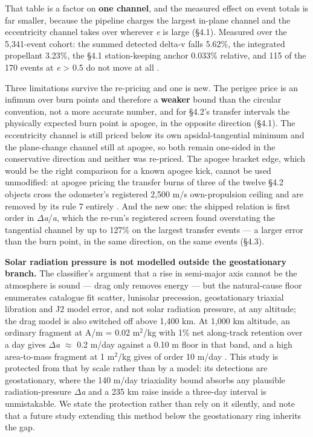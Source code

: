\documentclass[11pt]{article}
\begin{document}

That table is a factor on \textbf{one channel}, and the measured effect on event totals is far smaller, because the pipeline charges the largest in-plane channel and the eccentricity channel takes over wherever \emph{e} is large (\S{}4.1). Measured over the 5,341-event cohort: the summed detected delta-v falls 5.62\%, the integrated propellant 3.23\%, the \S{}4.1 station-keeping anchor 0.033\% relative, and 115 of the 170 events at \emph{e} > 0.5 do not move at all%
.

Three limitations survive the re-pricing and one is new. The perigee price is an infimum over burn points and therefore a \textbf{weaker} bound than the circular convention, not a more accurate number, and for \S{}4.2's transfer intervals the physically expected burn point is apogee, in the opposite direction (\S{}4.1). The eccentricity channel is still priced below its own apsidal-tangential minimum and the plane-change channel still at apogee, so both remain one-sided in the conservative direction and neither was re-priced. The apogee bracket edge, which would be the right comparison for a known apogee kick, cannot be used unmodified: at apogee pricing the transfer burns of three of the twelve \S{}4.2 objects cross the odometer's registered 2,500 m/s own-propulsion ceiling and are removed by its rule 7 entirely%
. And the new one: the shipped relation is first order in $\Delta$\emph{a}/\emph{a}, which the re-run's registered screen found overstating the tangential channel by up to 127\% on the largest transfer events --- a larger error than the burn point, in the same direction, on the same events (\S{}4.3).

\textbf{Solar radiation pressure is not modelled outside the geostationary branch.} The classifier's argument that a rise in semi-major axis cannot be the atmosphere is sound --- drag only removes energy --- but the natural-cause floor enumerates catalogue fit scatter, lunisolar precession, geostationary triaxial libration and J2 model error, and not solar radiation pressure, at any altitude; the drag model is also switched off above 1,400 km. At 1,000 km altitude, an ordinary fragment at A/m = 0.02 m\ensuremath{^{2}}/kg with 1\% net along-track retention over a day gives $\Delta$\emph{a} $\approx$ 0.2 m/day against a 0.10 m floor in that band, and a high area-to-mass fragment at 1 m\ensuremath{^{2}}/kg gives of order 10 m/day%
. This study is protected from that by scale rather than by a model: its detections are geostationary, where the 140 m/day triaxiality bound absorbs any plausible radiation-pressure $\Delta$\emph{a} and a 235 km raise inside a three-day interval is unmistakable. We state the protection rather than rely on it silently, and note that a future study extending this method below the geostationary ring inherits the gap.
\end{document}
